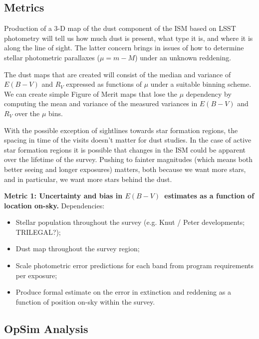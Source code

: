 
\subsection{Metrics}

\label{sec:\secname:metrics}

Production of a 3-D map of the dust component of the ISM based on LSST
photometry will tell us how much dust is present, what type it is, and
where it is along the line of sight.  The latter concern brings in
issues of how to determine stellar photometric parallaxes ($\mu =
m-M$) under an unknown reddening.

The dust maps that are created will consist of the median and variance
of $E(B-V)$ and $R_V$ expressed as functions of $\mu$ under a suitable
binning scheme. We can create simple Figure of Merit maps that lose
the $\mu$ dependency by computing the mean and variance of the
measured variances in $E(B-V)$ and $R_V$ over the $\mu$ bins.

With the possible exception of sightlines towards star formation
regions, the spacing in time of the visits doesn't matter for dust
studies. In the case of active star formation regions it is possible
that changes in the ISM could be apparent over the lifetime of the
survey.  Pushing to fainter magnitudes (which means both better seeing
and longer exposures) matters, both because we want more stars, and in
particular, we want more stars behind the dust.


{\bf Metric 1: Uncertainty and bias in $E(B-V)$~estimates as a
  function of location on-sky.} Dependencies:

\begin{itemize}
  \item Stellar population throughout the survey (e.g. Knut / Peter developments; TRILEGAL?);
    \item Dust map throughout the survey region;
    \item Scale photometric error predictions for each band from program requirements per exposure;
      \item Produce formal estimate on the error in extinction and reddening as a function of position on-sky within the survey.
\end{itemize}



\subsection{OpSim Analysis}
\label{sec:\secname:analysis}

